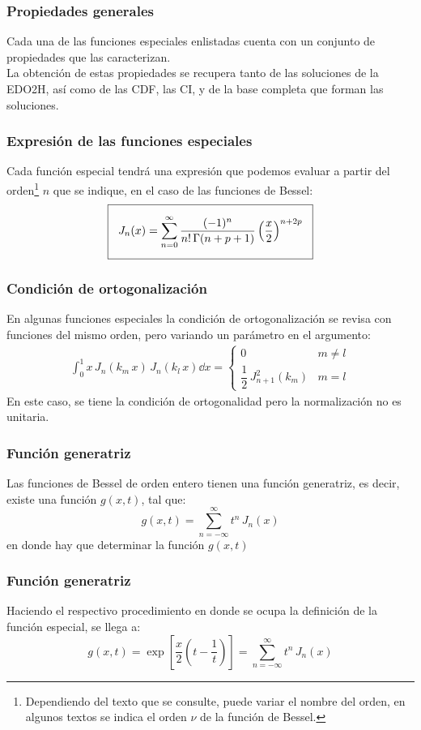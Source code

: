 \documentclass[12pt]{beamer}
\begin{document}
\begin{frame}
\frametitle{Propiedades generales}
Cada una de las funciones especiales enlistadas cuenta con un conjunto de propiedades que las caracterizan.
\\
\bigskip
\pause
La obtención de estas propiedades se recupera tanto de las soluciones de la EDO2H, así como de las CDF, las CI, y de la base completa que forman las soluciones.
\end{frame}
\begin{frame}
\frametitle{Expresión de las funciones especiales}
Cada función especial tendrá una expresión que podemos evaluar a partir del orden\footnote{Dependiendo del texto que se consulte, puede variar el nombre del orden, en algunos textos se indica el orden $\nu$ de la función de Bessel.} $n$ que se indique, \pause en el caso de las funciones de Bessel:
\begin{align}
\setlength{\fboxsep}{3\fboxsep}\boxed{
J_{n} (x) = \sum_{n=0}^{\infty} \dfrac{(-1)^{n}}{n! \, \Gamma (n + p + 1)} \left( \dfrac{x}{2} \right)^{n+2p}}
\label{eq:ecuacion_08_06}
\end{align}    
\end{frame}
\begin{frame}
\frametitle{Condición de ortogonalización}
En algunas funciones especiales la condición de ortogonalización se revisa con funciones del mismo orden, pero variando un parámetro en el argumento:
\pause
\begin{align*}
\int_{0}^{1} x \, J_{n}(k_{m} \, x) \, J_{n}(k_{l} \, x) \dd{x} = \begin{cases}
0 & m \neq l \\
\dfrac{1}{2} \, J_{n+1}^{2} (k_{m}) & m = l
\end{cases}
\end{align*}
\pause
En este caso, se tiene la condición de ortogonalidad pero la normalización no es unitaria.
\end{frame}
\begin{frame}
\frametitle{Función generatriz}
Las funciones de Bessel de orden entero tienen una función generatriz, es decir, existe una función $g(x, t)$, tal que:
\pause
\begin{equation}
g (x, t) = \sum_{n=-\infty}^{\infty} t^{n} \, J_{n} (x)
\label{eq:ecuacion_27_25}
\end{equation}
\pause
en donde hay que determinar la función $g (x, t)$
\end{frame}
\begin{frame}
\frametitle{Función generatriz}
Haciendo el respectivo procedimiento en donde se ocupa la definición de la función especial, se llega a:
\begin{equation}
g (x, t) = \exp \left[ \dfrac{x}{2} \left( t - \dfrac{1}{t} \right) \right] = \sum_{n=-\infty}^{\infty} t^{n} \, J_{n} (x)
\label{eq:ecuacion_27_27}
\end{equation}
\end{frame}
\end{document}

